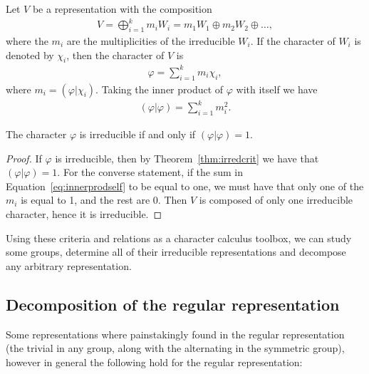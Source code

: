 \begin{note}
	Let $V$ be a representation with the composition 
	\begin{align*}
		V = \bigoplus_{i=1}^k m_i W_i = m_1W_1 \oplus m_2W_2 \oplus \dots,
	\end{align*}
	where the $m_i$ are the multiplicities of the irreducible $W_i$. If the character of $W_i$ is denoted by $\chi_i$, then the character of $V$ is
	\begin{align*}
		\varphi = \sum_{i=1}^k m_i \chi_i,
	\end{align*}
	where $m_i = (\varphi|\chi_i)$.	Taking the inner product of $\varphi$ with itself we have
	\begin{align}\label{eq:innerprodself}
		(\varphi|\varphi) = \sum_{i=1}^k m_i^2.
	\end{align}
\end{note}

\begin{theorem}
	The character $\varphi$ is irreducible if and only if $(\varphi|\varphi) = 1$.
\end{theorem}
\begin{proof}
	If $\varphi$ is irreducible, then by Theorem~\ref{thm:irredcrit} we have that $(\varphi|\varphi) = 1$. For the converse statement, if the sum in Equation~\ref{eq:innerprodself} to be equal to one, we must have that only one of the $m_i$ is equal to 1, and the rest are 0. Then $V$ is composed of only one irreducible character, hence it is irreducible.
\end{proof}

Using these criteria and relations as a character calculus toolbox, we can study some groups, determine all of their irreducible representations and decompose any arbitrary representation.

\subsection{Decomposition of the regular representation}

Some representations where painstakingly found in the regular representation (the trivial in any group, along with the alternating in the symmetric group), however in general the following hold for the regular representation:

